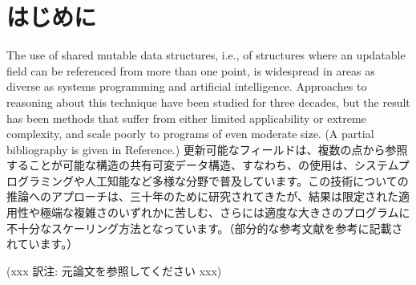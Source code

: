 \documentclass[submit,techreq,noauthor,onecolumn]{ipsj}
\begin{document}
\maketitle
\thispagestyle{empty}

\section{はじめに}

The use of shared mutable data structures, i.e., of structures where an updatable field can be referenced from more than one point, is widespread in areas as diverse as systems programming and artificial intelligence. Approaches to reasoning about this technique have been studied for three decades, but the result has been methods that suffer from either limited applicability or extreme complexity, and scale poorly to programs of even moderate size. (A partial bibliography is given in Reference.)
更新可能なフィールドは、複数の点から参照することが可能な構造の共有可変データ構造、すなわち、の使用は、システムプログラミングや人工知能など多様な分野で普及しています。この技術についての推論へのアプローチは、三十年のために研究されてきたが、結果は限定された適用性や極端な複雑さのいずれかに苦しむ、さらには適度な大きさのプログラムに不十分なスケーリング方法となっています。（部分的な参考文献を参考に記載されています。）

\begin{acknowledgment}
\end{acknowledgment}

\begin{thebibliography}{10}
  (xxx 訳注: 元論文を参照してください xxx)
\end{thebibliography}
\end{document}
